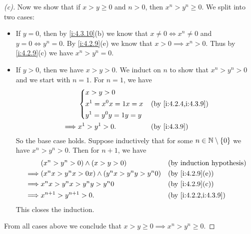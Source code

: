 \begin{proof}[(c)]
  Now we show that if \(x > y \geq 0\) and \(n > 0\), then \(x^n > y^n \geq 0\).
  We split into two cases:
  \begin{itemize}
    \item If \(y = 0\), then by \cref{i:4.3.10}(b) we know that \(x \neq 0 \iff x^n \neq 0\) and \(y = 0 \iff y^n = 0\).
          By \cref{i:4.2.9}(e) we know that \(x > 0 \implies x^n > 0\).
          Thus by \cref{i:4.2.9}(c) we have \(x^n > y^n = 0\).
    \item If \(y > 0\), then we have \(x > y > 0\).
          We induct on \(n\) to show that \(x^n > y^n > 0\) and we start with \(n = 1\).
          For \(n = 1\), we have
          \begin{align*}
                     & \begin{dcases}
                         x > y > 0            \\
                         x^1 = x^0 x = 1x = x \\
                         y^1 = y^0 y = 1y = y
                       \end{dcases} &  & \by{i:4.2.4,i:4.3.9}    \\
            \implies & x^1 > y^1 > 0.          &  & \by{i:4.3.9}
          \end{align*}
          So the base case holds.
          Suppose inductively that for some \(n \in \mathbb{N} \setminus \left\lbrace0\right\rbrace\) we have \(x^n > y^n > 0\).
          Then for \(n + 1\), we have
          \begin{align*}
                     & (x^n > y^n > 0) \land (x > y > 0)                  &  & \byIH                \\
            \implies & (x^n x > y^n x > 0x) \land (y^n x > y^n y > y^n 0) &  & \by{i:4.2.9}[e]      \\
            \implies & x^n x > y^n x > y^n y > y^n 0                      &  & \by{i:4.2.9}[c]      \\
            \implies & x^{n + 1} > y^{n + 1} > 0.                         &  & \by{i:4.2.2,i:4.3.9}
          \end{align*}
          This closes the induction.
  \end{itemize}
  From all cases above we conclude that \(x > y \geq 0 \implies x^n > y^n \geq 0\).
\end{proof}

